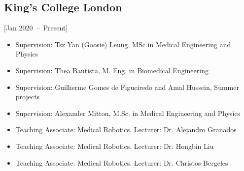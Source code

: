 \documentclass{mycv}
\begin{document}
\subsection{King's College London}[Jan 2020~--~Present]
\begin{itemize}
	\item Supervision: Tsz Yan (Goosie) Leung, MSc in Medical Engineering and Physics  
	\item Supervision: Thea Bautista, M. Eng. in Biomedical Engineering  
	\item Supervision: Guilherme Gomes de Figueiredo and Amal Hussein, Summer projects  
	\item Supervision: Alexander Mitton, M.Sc. in Medical Engineering and Physics  
	\item Teaching Associate: Medical Robotics. Lecturer: Dr. Alejandro Granados 
	\item Teaching Associate: Medical Robotics. Lecturer: Dr. Hongbin Liu 
	\item Teaching Associate: Medical Robotics. Lecturer: Dr. Christos Bergeles 
\end{itemize}

  






\end{document}
